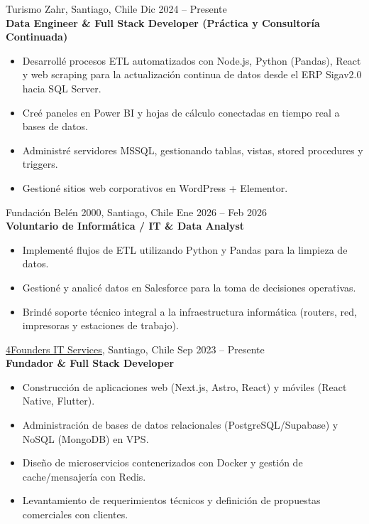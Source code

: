 \documentclass[10pt,a4paper]{article}
\begin{document}
\vspace{0.8em}

\noindent Turismo Zahr, Santiago, Chile \hfill Dic 2024 – Presente\\[0.2em]
\textbf{Data Engineer \& Full Stack Developer (Práctica y Consultoría Continuada)}
\vspace{-0.3em}
\begin{itemize}[leftmargin=1.5em, itemsep=2pt, parsep=0pt]
    \item Desarrollé procesos ETL automatizados con Node.js, Python (Pandas), React y web scraping para la actualización continua de datos desde el ERP Sigav2.0 hacia SQL Server.
    \item Creé paneles en Power BI y hojas de cálculo conectadas en tiempo real a bases de datos.
    \item Administré servidores MSSQL, gestionando tablas, vistas, stored procedures y triggers.
    \item Gestioné sitios web corporativos en WordPress + Elementor.
\end{itemize}

\vspace{0.8em}
\noindent Fundación Belén 2000, Santiago, Chile \hfill Ene 2026 – Feb 2026\\[0.2em]
\textbf{Voluntario de Informática / IT \& Data Analyst}
\vspace{-0.3em}
\begin{itemize}[leftmargin=1.5em, itemsep=2pt, parsep=0pt]
    \item Implementé flujos de ETL utilizando Python y Pandas para la limpieza de datos.
    \item Gestioné y analicé datos en Salesforce para la toma de decisiones operativas.
    \item Brindé soporte técnico integral a la infraestructura informática (routers, red, impresoras y estaciones de trabajo).
\end{itemize}

\vspace{0.8em}
\noindent \href{https://www.4founders.cl}{\underline{4Founders IT Services}}, Santiago, Chile \hfill Sep 2023 – Presente\\[0.2em]
\textbf{Fundador \& Full Stack Developer}
\vspace{-0.3em}
\begin{itemize}[leftmargin=1.5em, itemsep=2pt, parsep=0pt]
    \item Construcción de aplicaciones web (Next.js, Astro, React) y móviles (React Native, Flutter).
    \item Administración de bases de datos relacionales (PostgreSQL/Supabase) y NoSQL (MongoDB) en VPS.
    \item Diseño de microservicios contenerizados con Docker y gestión de cache/mensajería con Redis.
    \item Levantamiento de requerimientos técnicos y definición de propuestas comerciales con clientes.
\end{itemize}
\end{document}
